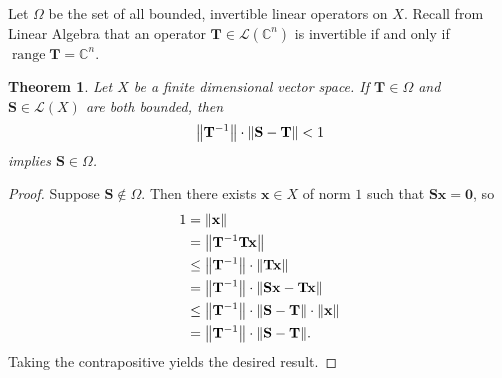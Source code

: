 \documentclass[11pt]{article}
\renewcommand{\vec}[1]{\mathbf{#1}}
\newcommand{\mat}[1]{\mathbf{#1}}
\newcommand{\range}{\operatorname{range}}
\newtheorem{theorem}{Theorem}
\begin{document}
Let $\Omega$ be the set of all bounded, invertible linear operators on $X$. Recall from Linear Algebra that an operator $\mat{T} \in \mathcal{L}(\mathbb{C}^{n})$ is invertible if and only if $\range \mat{T} = \mathbb{C}^{n}$.

\begin{theorem}
	Let $X$ be a finite dimensional vector space. If $\mat{T} \in \Omega$ and $\mat{S} \in \mathcal{L}(X)$ are both bounded, then
	\[
		\norm{\mat{T}^{-1}} \cdot \norm{\mat{S} - \mat{T}} < 1
	\]
	implies $\mat{S} \in \Omega$.
\end{theorem}
\begin{adjustwidth}{0.5cm}{}
	\begin{proof}
		Suppose $\mat{S} \notin \Omega$. Then there exists $\vec{x} \in X$ of norm $1$ such that $\mat{S} \vec{x} = \vec{0}$, so
		\begin{align*}
			1 &= \norm{\vec{x}} \\
			&= \norm{\mat{T}^{-1}\mat{T} \vec{x}} \\
			&\le \norm{\mat{T}^{-1}} \cdot \norm{\mat{T} \vec{x}} \\
			&= \norm{\mat{T}^{-1}} \cdot \norm{\mat{S} \vec{x} - \mat{T} \vec{x}} \\
			&\le \norm{\mat{T}^{-1}} \cdot \norm{\mat{S} - \mat{T}} \cdot \norm{\vec{x}} \\
			&= \norm{\mat{T}^{-1}} \cdot \norm{\mat{S} - \mat{T}}.
		\end{align*}
		Taking the contrapositive yields the desired result.
	\end{proof}
\end{adjustwidth}

\newpage
\end{document}
